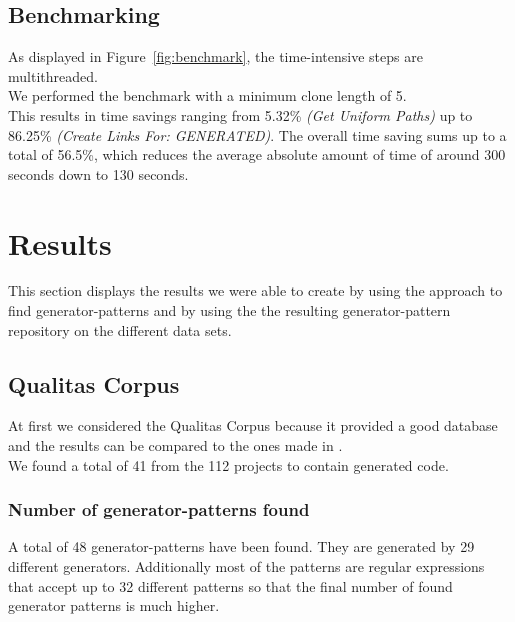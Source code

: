 \subsection{Benchmarking}
\label{section:benchmark}
As displayed in Figure~\ref{fig:benchmark}, the time-intensive steps are multithreaded.\\
We performed the benchmark with a minimum clone length of 5.\\
This results in time savings ranging from 5.32\% \textit{(Get Uniform Paths)} up to 86.25\% \textit{(Create Links For: GENERATED)}. The overall time saving sums up to a total of 56.5\%, which reduces the average absolute amount of time of around 300 seconds down to 130 seconds. 



\section{Results}
This section displays the results we were able to create by using the approach to find generator-patterns and by using the the resulting generator-pattern repository on the different data sets. 
\subsection{Qualitas Corpus}
At first we considered the Qualitas Corpus because it provided a good database and the results can be compared to the ones made in \cite{Bernwieser2014}.\\
We found a total of 41 from the 112 projects to contain generated code. 

\subsubsection{Number of generator-patterns found}
A total of 48 generator-patterns have been found. They are generated by 29 different generators. Additionally most of the patterns are regular expressions that accept up to 32 different patterns so that the final number of found generator patterns is much higher.


